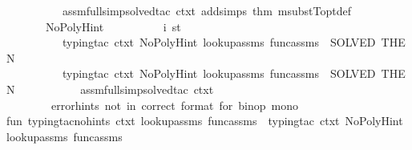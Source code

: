 \begin{isabellebody}
\ \ \ \ \ \ \ \ \ \ assm{\isacharunderscore}{\kern0pt}full{\isacharunderscore}{\kern0pt}simp{\isacharunderscore}{\kern0pt}solved{\isacharunderscore}{\kern0pt}tac\ {\isacharparenleft}{\kern0pt}ctxt\ addsimps\ {\isacharbrackleft}{\kern0pt}{\isacharat}{\kern0pt}{\isacharbraceleft}{\kern0pt}thm\ msubstT{\isacharunderscore}{\kern0pt}opt{\isacharunderscore}{\kern0pt}def{\isacharbraceright}{\kern0pt}{\isacharbrackright}{\kern0pt}{\isacharparenright}{\kern0pt}\isanewline
\ \ \ \ \ \ \ \ {\isacharparenright}{\kern0pt}\isanewline
\ \ \ \ \ \ {\isacharbar}{\kern0pt}\ NoPolyHint\ {\isacharequal}{\kern0pt}{\isachargreater}{\kern0pt}\ \isanewline
\ \ \ \ \ \ \ \ {\isacharparenleft}{\kern0pt}i{\isacharcomma}{\kern0pt}\ st{\isacharparenright}{\kern0pt}\ {\isacharbar}{\kern0pt}{\isacharminus}{\kern0pt}{\isachargreater}{\kern0pt}\isanewline
\ \ \ \ \ \ \ \ {\isacharparenleft}{\kern0pt}\ \isanewline
\ \ \ \ \ \ \ \ \ \ {\isacharparenleft}{\kern0pt}{\isacharparenleft}{\kern0pt}typing{\isacharunderscore}{\kern0pt}tac\ ctxt\ NoPolyHint\ lookup{\isacharunderscore}{\kern0pt}assms\ func{\isacharunderscore}{\kern0pt}assms{\isacharparenright}{\kern0pt}\ {\isacharbar}{\kern0pt}{\isachargreater}{\kern0pt}\ SOLVED{\isacharprime}{\kern0pt}{\isacharparenright}{\kern0pt}\ THEN{\isacharprime}{\kern0pt}\isanewline
\ \ \ \ \ \ \ \ \ \ {\isacharparenleft}{\kern0pt}{\isacharparenleft}{\kern0pt}typing{\isacharunderscore}{\kern0pt}tac\ ctxt\ NoPolyHint\ lookup{\isacharunderscore}{\kern0pt}assms\ func{\isacharunderscore}{\kern0pt}assms{\isacharparenright}{\kern0pt}\ {\isacharbar}{\kern0pt}{\isachargreater}{\kern0pt}\ SOLVED{\isacharprime}{\kern0pt}{\isacharparenright}{\kern0pt}\ THEN{\isacharprime}{\kern0pt}\ \isanewline
\ \ \ \ \ \ \ \ \ \ assm{\isacharunderscore}{\kern0pt}full{\isacharunderscore}{\kern0pt}simp{\isacharunderscore}{\kern0pt}solved{\isacharunderscore}{\kern0pt}tac\ ctxt\isanewline
\ \ \ \ \ \ \ \ {\isacharparenright}{\kern0pt}\isanewline
\ \ \ \ \ {\isacharbar}{\kern0pt}\ {\isacharunderscore}{\kern0pt}\ {\isacharequal}{\kern0pt}{\isachargreater}{\kern0pt}\ error{\isacharparenleft}{\kern0pt}{\isachardoublequote}{\kern0pt}hints\ not\ in\ correct\ format\ for\ binop\ mono{\isachardoublequote}{\kern0pt}{\isacharparenright}{\kern0pt}\isanewline
\isanewline
fun\ typing{\isacharunderscore}{\kern0pt}tac{\isacharunderscore}{\kern0pt}no{\isacharunderscore}{\kern0pt}hints\ ctxt\ lookup{\isacharunderscore}{\kern0pt}assms\ func{\isacharunderscore}{\kern0pt}assms\ {\isacharequal}{\kern0pt}\ typing{\isacharunderscore}{\kern0pt}tac\ ctxt\ NoPolyHint\ lookup{\isacharunderscore}{\kern0pt}assms\ func{\isacharunderscore}{\kern0pt}assms\isanewline
{\isacartoucheclose}%
\endisatagML
{\isafoldML}%
%
\isadelimML
\isanewline
%
\endisadelimML
%
\isadelimtheory
\isanewline
%
\endisadelimtheory
%
\isatagtheory
{}\isamarkupfalse%
%
\endisatagtheory
{\isafoldtheory}%
%
\isadelimtheory
%
\endisadelimtheory
%
\end{isabellebody}%
\endinput
